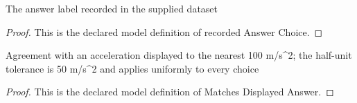 \begin{definition}
  \label{def:physics:phyx-mini-0273:phyxminiproblems-problemphyxmini0273-recordedanswerchoice}
  The answer label recorded in the supplied dataset
\end{definition}
\begin{proof}
  This is the declared model definition of recorded Answer Choice.
\end{proof}
\begin{definition}
  \label{def:physics:phyx-mini-0273:phyxminiproblems-problemphyxmini0273-matchesdisplayedanswer}
  Agreement with an acceleration displayed to the nearest 100 m/s\textasciicircum{}2; the half-unit tolerance is 50 m/s\textasciicircum{}2 and applies uniformly to every choice
\end{definition}
\begin{proof}
  This is the declared model definition of Matches Displayed Answer.
\end{proof}
